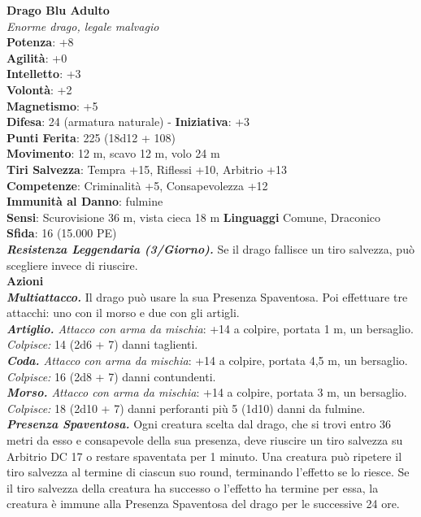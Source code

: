 \begin{multicols}{2}
\medskip\textbf{Drago Blu Adulto}\\
\emph{Enorme drago, legale malvagio}\\
\textbf{Potenza}: +8\\
\textbf{Agilità}: +0\\
\textbf{Intelletto}: +3\\
\textbf{Volontà}: +2\\
\textbf{Magnetismo}: +5\\
\textbf{Difesa}: 24 (armatura naturale) - \textbf{Iniziativa}: +3\\
\textbf{Punti Ferita}: 225 (18d12 + 108)\\
\textbf{Movimento}: 12 m, scavo 12 m, volo 24 m\\
\textbf{Tiri Salvezza}: Tempra +15, Riflessi +10, Arbitrio +13\\
\textbf{Competenze}: Criminalità +5, Consapevolezza +12\\
\textbf{Immunità al Danno}: fulmine\\
\textbf{Sensi}: Scurovisione 36 m, vista cieca 18 m
\textbf{Linguaggi} Comune, Draconico\\
\textbf{Sfida}: 16 (15.000 PE)\smallskip\\
\emph{\textbf{Resistenza Leggendaria (3/Giorno).}} Se il drago fallisce un tiro salvezza, può scegliere invece di riuscire.\\
\smallskip\textbf{Azioni}\\
\emph{\textbf{Multiattacco.}} Il drago può usare la sua Presenza Spaventosa. Poi effettuare tre attacchi: uno con il morso e due con gli artigli.\\
\emph{\textbf{Artiglio.} Attacco con arma da mischia}: +14 a colpire, portata 1 m, un bersaglio.\\
\emph{Colpisce:} 14 (2d6 + 7) danni taglienti.\\
\emph{\textbf{Coda.} Attacco con arma da mischia}: +14 a colpire, portata 4,5 m, un bersaglio.\\
\emph{Colpisce:} 16 (2d8 + 7) danni contundenti.\\
\emph{\textbf{Morso.} Attacco con arma da mischia}: +14 a colpire, portata 3 m, un bersaglio.\\
\emph{Colpisce:} 18 (2d10 + 7) danni perforanti più 5 (1d10) danni da fulmine.\\
\emph{\textbf{Presenza Spaventosa.}} Ogni creatura scelta dal drago, che si trovi entro 36 metri da esso e consapevole della sua presenza, deve riuscire un tiro salvezza su Arbitrio DC 17 o restare spaventata per 1 minuto. Una creatura può ripetere il tiro salvezza al termine di ciascun suo round, terminando l'effetto se lo riesce. Se il tiro salvezza della creatura ha successo o l'effetto ha termine per essa, la creatura è immune alla Presenza Spaventosa del drago per le successive 24 ore.\\

\end{multicols}
